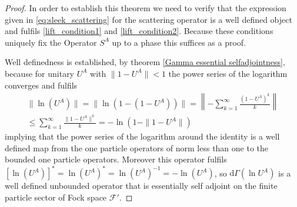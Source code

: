 \documentclass[b5paper,draft,openbib,12pt]{memoir}
\begin{document}
\begin{proof}
In order to establish this theorem we need to verify that the expression given in \eqref{eq:sleek_scattering} for the scattering operator
 is a well defined object
and fulfils \eqref{lift_condition1} and \eqref{lift_condition2}. Because these conditions uniquely fix the Operator \(S^A\)  up to a phase this suffices as a proof.

Well definedness is established, by theorem \ref{Gamma essential selfadjointness}, because for unitary \(U^A\)
with \(\|1-U^A\|<1\) the power series of the logarithm converges and fulfils
\begin{align}
\|\ln(U^A)\|=\|\ln (1-(1-U^A))\|= \left\| -\sum_{k=1}^\infty \frac{(1-U^A)^k}{k} \right\|\\
 \le   \sum_{k=1}^\infty \frac{\|1-U^A\|^k}{k}=-\ln(1-\|1-U^A\|)
\end{align}
implying that the power series of the logarithm around the identity is a well defined map from the one particle operators of norm less than
one to the bounded one particle operators. Moreover this operator fulfils \([\ln (U^A)]^*=\ln (U^A)^*= \ln (U^A)^{-1}=-\ln (U^A)\), so 
\(\mathrm{d}\Gamma(\ln U^A)\) is a well defined unbounded operator that is essentially self adjoint on the finite particle sector of Fock space \(\mathcal{F}'\).



\end{proof}
\end{document}
